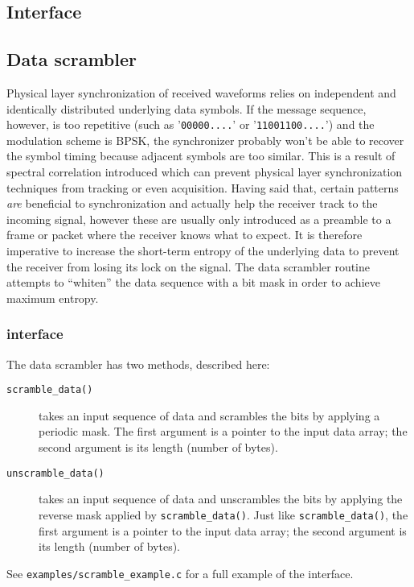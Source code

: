 %
%
\subsection{Interface}
\label{module:random:interface}
%



% 
%
\subsection{Data scrambler}
\label{module:random:data_scrambler}
Physical layer synchronization of received waveforms relies on independent and
identically distributed underlying data symbols.
If the message sequence, however, is too repetitive
(such as '{\tt 00000....}' or '{\tt 11001100....}')
and the modulation scheme is BPSK, the synchronizer probably won't be able to
recover the symbol timing because adjacent symbols are too similar.
This is a result of spectral correlation introduced which can prevent physical
layer synchronization techniques from tracking or even acquisition.
Having said that, certain patterns {\em are} beneficial to synchronization and
actually help the receiver track to the incoming signal, however these are
usually only introduced as a preamble to a frame or packet where the receiver
knows what to expect.
It is therefore imperative to increase the short-term entropy of the
underlying data to prevent the receiver from losing its lock on the signal.
The data scrambler routine attempts to ``whiten'' the data sequence with a bit
mask in order to achieve maximum entropy.

\subsubsection{interface}
The data scrambler has two methods, described here:
\begin{description}
\item[{\tt scramble\_data()}]
    takes an input sequence of data and scrambles the bits by applying a
    periodic mask.
    The first argument is a pointer to the input data array; the second
    argument is its length (number of bytes).
\item[{\tt unscramble\_data()}]
    takes an input sequence of data and unscrambles the bits by applying the
    reverse mask applied by {\tt scramble\_data()}.
    Just like {\tt scramble\_data()}, the first argument is a pointer to the
    input data array; the second argument is its length (number of bytes).
\end{description}

See {\tt examples/scramble\_example.c} for a full example of the interface.

